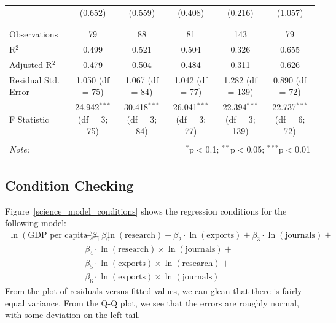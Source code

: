 \documentclass[11pt]{article}
\begin{document}
\begin{landscape}
\begin{table}[!htbp]
\begin{tabular}{@{\extracolsep{5pt}}lccccc}
  & (0.652) & (0.559) & (0.408) & (0.216) & (1.057) \\ 
  & & & & & \\ 
\hline \\[-1.8ex] 
Observations & 79 & 88 & 81 & 143 & 79 \\ 
R$^{2}$ & 0.499 & 0.521 & 0.504 & 0.326 & 0.655 \\ 
Adjusted R$^{2}$ & 0.479 & 0.504 & 0.484 & 0.311 & 0.626 \\ 
Residual Std. Error & 1.050 (df = 75) & 1.067 (df = 84) & 1.042 (df = 77) & 1.282 (df = 139) & 0.890 (df = 72) \\ 
F Statistic & 24.942$^{***}$ (df = 3; 75) & 30.418$^{***}$ (df = 3; 84) & 26.041$^{***}$ (df = 3; 77) & 22.394$^{***}$ (df = 3; 139) & 22.737$^{***}$ (df = 6; 72) \\ 
\hline 
\hline \\[-1.8ex] 
\textit{Note:}  & \multicolumn{5}{r}{$^{*}$p$<$0.1; $^{**}$p$<$0.05; $^{***}$p$<$0.01} \\ 
\end{tabular} 
\end{table} 
\end{landscape}
\restoregeometry
\doublespacing


\subsection{Condition Checking}

Figure~\ref{science_model_conditions} shows the regression conditions for the following model:
\begin{align*}
\ln(\textrm{GDP per capita}) = \beta_0 &+
\beta_1 \cdot \ln(\textrm{research}) +
\beta_2 \cdot \ln(\textrm{exports}) +
\beta_3 \cdot \ln(\textrm{journals}) + \\
&\beta_4 \cdot \ln(\textrm{research}) \times \ln(\textrm{journals}) + \\
&\beta_5 \cdot \ln(\textrm{exports}) \times \ln(\textrm{research}) + \\
&\beta_6 \cdot \ln(\textrm{exports}) \times \ln(\textrm{journals})
\end{align*}
From the plot of residuals versus fitted values, we can glean that there is fairly equal variance.
From the Q-Q plot, we see that the errors are roughly normal, with some deviation on the left tail.
\end{document}
